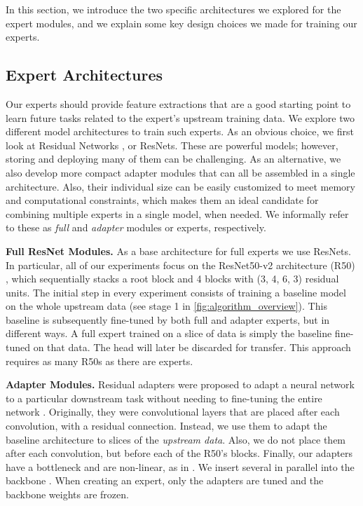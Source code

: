 \documentclass{article}
\begin{document}
In this section, we introduce the two specific architectures we explored for the expert modules, and we explain some key design choices we made for training our experts.

\subsection{Expert Architectures}

Our experts should provide feature extractions that are a good
starting point to learn future tasks related to the expert's
upstream training data.
We explore two different model architectures to train such experts.
As an obvious choice, we first look at Residual Networks \cite{he2016deep}, or ResNets.
These are powerful models; however, storing and deploying many of 
them can be challenging.
As an alternative, we also develop more compact adapter modules that can 
all be assembled in a single architecture.
Also, their individual size can be easily customized to meet memory and 
computational constraints, which makes them an ideal candidate for 
combining multiple experts in a single model, when needed.
We informally refer to these as \emph{full} and \emph{adapter} modules or experts, respectively.

\textbf{Full ResNet Modules.} As a base architecture for full experts we use ResNets.
In particular, all of our experiments focus on the ResNet50-v2 architecture (R50) \cite{He2016Identity}, which sequentially stacks a root block and 4 blocks with (3, 4, 6, 3) residual units.
The initial step in every experiment consists of training a baseline model  on the whole upstream data (see stage 1 in \cref{fig:algorithm_overview}).
This baseline is subsequently fine-tuned by both full and adapter experts, but in different ways.
A full expert trained on a slice of data is simply the baseline  fine-tuned on that data.
The head will later be discarded for transfer.
This approach requires as many R50s as there are experts.


\textbf{Adapter Modules.}
Residual adapters were proposed to adapt a neural network to a particular downstream task without needing to fine-tuning the entire network \cite{rebuffi2017learning}.
Originally, they were  convolutional 
layers  that are placed after each  convolution, with a residual connection.
Instead, we use them to adapt the baseline architecture 
to slices of the \emph{upstream data}. 
Also, we do not place them after each 
 convolution, but before each of the R50's blocks. 
Finally, our adapters have a bottleneck and are non-linear, 
as in \cite{houlsby2019parameter}. We insert several in parallel into the backbone .
When creating an expert, only the adapters are tuned and the backbone weights are frozen.
\end{document}
